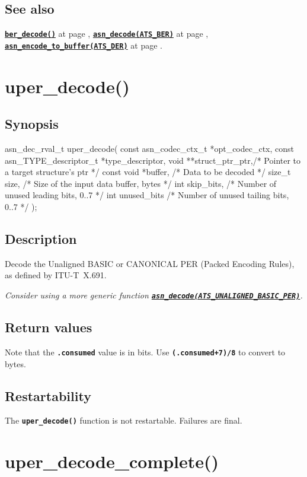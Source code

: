 \documentclass[english,oneside,12pt]{book}
\newcommand{\apisection}[2]{\clearpage\section{\label{#1}#2}}
\newcommand{\api}[2]{\hyperref[#1]{\code{#2}}}
\newcommand{\seealso}[2]{\api{#1}{#2} at page \pageref{#1}}
\newcommand{\code}[1]{\texttt{\textbf{\lstinline{#1}}}}
\begin{document}
\subsection*{See also}
\seealso{sec:ber_decode}{ber_decode()},
\seealso{sec:asn_decode}{asn_decode(ATS_BER)},
\seealso{sec:asn_encode_to_buffer}{asn_encode_to_buffer(ATS_DER)}.

\apisection{sec:uper_decode}{uper\_decode()}

\subsection*{Synopsis}

\begin{signature}
asn_dec_rval_t uper_decode(
    const asn_codec_ctx_t *opt_codec_ctx,
    const asn_TYPE_descriptor_t *type_descriptor,
    void **struct_ptr_ptr,/* Pointer to a target structure's ptr */
    const void *buffer,   /* Data to be decoded */
    size_t size,          /* Size of the input data buffer, bytes */
    int skip_bits,        /* Number of unused leading bits, 0..7 */
    int unused_bits       /* Number of unused tailing bits, 0..7 */
);
\end{signature}

\subsection*{Description}

Decode the Unaligned BASIC or CANONICAL PER (Packed Encoding Rules),
as defined by ITU-T~X.691.\newline

\noindent\emph{Consider using a more generic function \api{sec:asn_decode}{asn_decode(ATS_UNALIGNED_BASIC_PER)}.}

\subsection*{Return values}

Note that the \code{.consumed} value is in bits.
Use \code{(.consumed+7)/8} to convert to bytes.

\subsection*{Restartability}
The \code{uper_decode()} function is not restartable.
Failures are final.

\apisection{sec:uper_decode_complete}{uper\_decode\_complete()}
\end{document}
